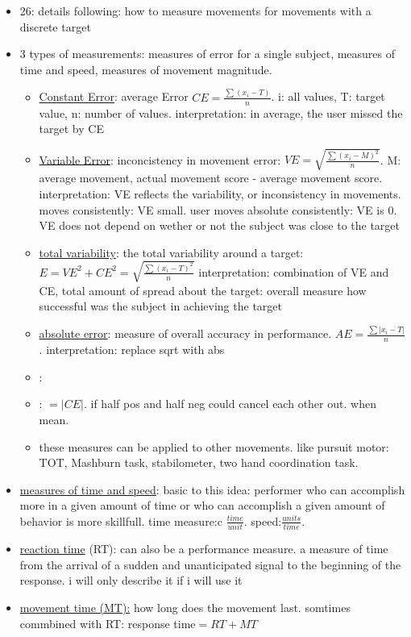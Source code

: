 	\begin{itemize}
		\item 26: details following: how to measure movements for movements with a discrete target
		\item 3 types of measurements: measures of error for a single subject, measures of time and speed, measures of movement magnitude.
		\begin{itemize}
		\item \underline{Constant Error}: average Error $CE=\frac{\sum(x_i-T)}{n}$. i: all values, T: target value, n: number of values. interpretation: in average, the user missed the target by CE
		\item \underline{Variable Error}: inconcistency in movement error: $VE=\sqrt{\frac{\sum(x_i-M)^2}{n}}$. M: average movement, actual movement score - average movement score. interpretation: VE reflects the variability, or inconsistency in movements. moves consistently: VE small. user moves absolute consistently: VE is 0. VE does not depend on wether or not the subject was close to the target
		\item \underline{total variability}: the total variability around a target: $E=VE^2+CE^2=\sqrt{\frac{\sum(x_i-T)^2}{n}}$
		interpretation: combination of VE and CE, total amount of spread about the target: overall measure how successful was the subject in achieving the target
		\item \underline{absolute error}: measure of overall accuracy in performance. $AE=\frac{\sum|x_i-T|}{n}$. interpretation: replace sqrt with abs
		\item {}: \todo
		\item {}: $=|CE|$. if half pos and half neg could cancel each other out. when mean.
		\item these measures can be applied to other movements. like pursuit motor: TOT, Mashburn task, stabilometer, two hand coordination task.
	\end{itemize}
		
		\item \underline{measures of time and speed}: basic to this idea: performer who can accomplish more in a given amount of time or who can accomplish a given amount of behavior is  more skillfull. time measure:c $\frac{time}{unit}$. speed:$\frac{units}{time}$.
		\item \underline{reaction time} (RT): can also be a performance measure. a measure of time from the arrival of a sudden and unanticipated signal to the beginning of the response. 
		i will only describe it if i will use it
		\item \underline{movement time (MT):} how long does the movement last. somtimes commbined with RT: response time$=RT+MT$
		
	\end{itemize}
